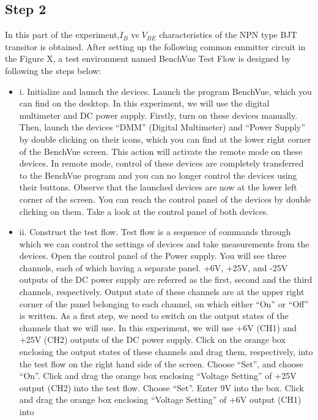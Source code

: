 \documentclass[letterpaper,12pt]{article}
\begin{document}
\subsection{Step 2}
In this part of the experiment,\(I_B\) vs \( V_{BE}\) characteristics of the NPN type BJT transitor is obtained. After setting up the following common emmitter circuit in the Figure X, a test environment named BenchVue Test Flow is designed by following the steps below:
\begin{itemize}
    \item i. Initialize and launch the devices.
    Launch the program BenchVue, which you can find on the desktop.
    In this experiment, we will use the digital multimeter and DC power supply. Firstly,
    turn on these devices manually. Then, launch the devices “DMM” (Digital Multimeter)
    and “Power Supply” by double clicking on their icons, which you can find at the lower
    right corner of the BenchVue screen. This action will activate the remote mode on these
    devices. In remote mode, control of these devices are completely transferred to the
    BenchVue program and you can no longer control the devices using their buttons.
    Observe that the launched devices are now at the lower left corner of the screen. You
    can reach the control panel of the devices by double clicking on them. Take a look at
    the control panel of both devices.
    \item ii. Construct the test flow. Test flow is a sequence of commands through which we can control
    the settings of devices and take measurements from the devices.
    Open the control panel of the Power supply. You will see three channels, each of which
    having a separate panel. +6V, +25V, and -25V outputs of the DC power supply are
    referred as the first, second and the third channels, respectively.
    Output state of these channels are at the upper right corner of the panel belonging to
    each channel, on which either “On” or “Off” is written. As a first step, we need to switch
    on the output states of the channels that we will use. In this experiment, we will use
    +6V (CH1) and +25V (CH2) outputs of the DC power supply. Click on the orange box
    enclosing the output states of these channels and drag them, respectively, into the test
    flow on the right hand side of the screen. Choose “Set”, and choose “On”.
    Click and drag the orange box enclosing “Voltage Setting” of +25V output (CH2) into
    the test flow. Choose “Set”. Enter 9V into the box.
    Click and drag the orange box enclosing “Voltage Setting” of +6V output (CH1) into

\end{itemize}
\end{document}
